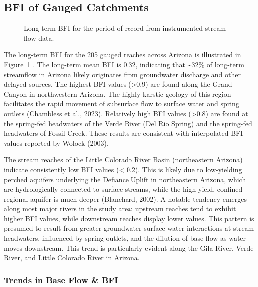 \documentclass[
]{agujournal2019}
\begin{document}
\subsection{BFI of Gauged Catchments}\label{bfi-of-gauged-catchments}

\begin{figure}


\caption{\label{fig-instrumented-bfi}Long-term BFI for the period of
record from instrumented stream flow data.}

\end{figure}%

The long-term BFI for the 205 gauged reaches across Arizona is
illustrated in Figure~\ref{fig-instrumented-bfi} . The long-term mean
BFI is 0.32, indicating that \textasciitilde32\% of long-term streamflow
in Arizona likely originates from groundwater discharge and other
delayed sources. The highest BFI values (\textgreater0.9) are found
along the Grand Canyon in northwestern Arizona. The highly karstic
geology of this region facilitates the rapid movement of subsurface flow
to surface water and spring outlets (Chambless et al., 2023). Relatively
high BFI values (\textgreater0.8) are found at the spring-fed headwaters
of the Verde River (Del Rio Spring) and the spring-fed headwaters of
Fossil Creek. These results are consistent with interpolated BFI values
reported by Wolock (2003).

The stream reaches of the Little Colorado River Basin (northeastern
Arizona) indicate consistently low BFI values (\textless{} 0.2). This is
likely due to low-yielding perched aquifers underlying the Defiance
Uplift in northeastern Arizona, which are hydrologically connected to
surface streams, while the high-yield, confined regional aquifer is much
deeper (Blanchard, 2002). A notable tendency emerges along most major
rivers in the study area: upstream reaches tend to exhibit higher BFI
values, while downstream reaches display lower values. This pattern is
presumed to result from greater groundwater-surface water interactions
at stream headwaters, influenced by spring outlets, and the dilution of
base flow as water moves downstream. This trend is particularly evident
along the Gila River, Verde River, and Little Colorado River in Arizona.

\subsubsection{Trends in Base Flow \& BFI}\label{sec-bfi-trends}
\end{document}
